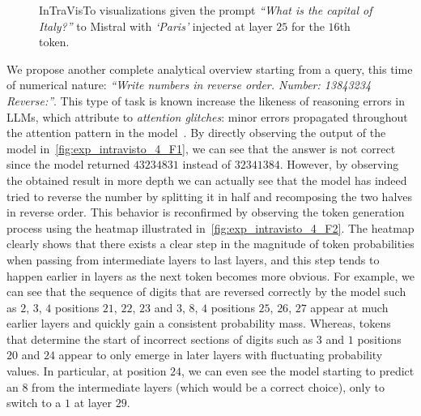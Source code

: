 \begin{figure}[t!]
    \centering
    \begingroup%
    \captionsetup{width=0.63\textwidth}%
    \endgroup%
    \caption[InTraVisTo visualizations given the prompt \emph{``What is the capital of Italy?''} to Mistral with injections.]{InTraVisTo visualizations given the prompt \emph{``What is the capital of Italy?''} to Mistral with \emph{`Paris'} injected at layer $25$ for the $16$th token.}
    \label{fig:exp_intravisto_4_E}
\end{figure}

We propose another complete analytical overview starting from a query, this time of numerical nature: \emph{``Write numbers in reverse order. Number: 13843234 Reverse:''}.
This type of task is known increase the likeness of reasoning errors in LLMs, which  attribute to \emph{attention glitches}: minor errors propagated throughout the attention pattern in the model~\cite{liu2023}.
By directly observing the output of the model in~\cref{fig:exp_intravisto_4_F1}, we can see that the answer is not correct since the model returned $43234831$ instead of $32341384$.
However, by observing the obtained result in more depth we can actually see that the model has indeed tried to reverse the number by splitting it in half and recomposing the two halves in reverse order.
This behavior is reconfirmed by observing the token generation process using the heatmap illustrated in~\cref{fig:exp_intravisto_4_F2}.
The heatmap clearly shows that there exists a clear step in the magnitude of token probabilities when passing from intermediate layers to last layers, and this step  tends to happen earlier in layers as the next token becomes more obvious.
For example, we can see that the sequence of digits that are reversed correctly by the model such as $2$, $3$, $4$  positions $21$, $22$, $23$ and $3$, $8$, $4$  positions $25$, $26$, $27$ appear at much earlier layers and quickly gain a consistent probability mass.
Whereas, tokens that determine the start of incorrect sections of digits such as $3$ and $1$  positions $20$ and $24$ appear to only emerge in later layers with fluctuating probability values.
In particular,  at position $24$, we can even see the model starting to predict an $8$ from the intermediate layers (which would be a correct choice), only to switch to a $1$ at layer $29$.

